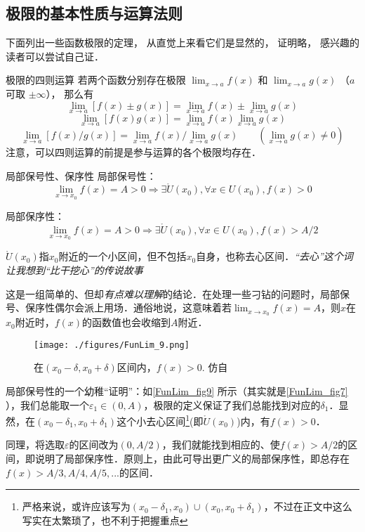\subsection{极限的基本性质与运算法则}
下面列出一些函数极限的定理， 从直觉上来看它们是显然的， 证明略， 感兴趣的读者可以尝试自己证．
\begin{theorem}{极限的四则运算}
若两个函数分别存在极限 $\lim_{x\to a} f(x)$ 和 $\lim_{x\to a} g(x)$ （$a$ 可取 $\pm \infty$）， 那么有
\begin{equation}
\lim_{x\to a} [f(x) \pm g(x)] = \lim_{x\to a}f(x) \pm  \lim_{x\to a} g(x)
\end{equation}
\begin{equation}
\lim_{x\to a} [f(x) g(x)] = \lim_{x\to a}f(x) \lim_{x\to a} g(x)
\end{equation}
\begin{equation}
\lim_{x\to a} [f(x)/g(x)] = \lim_{x\to a}f(x)/\lim_{x\to a} g(x) \qquad (\lim_{x\to a} g(x) \ne 0)
\end{equation}
注意，可以四则运算的前提是参与运算的各个极限均存在．
\end{theorem}

\begin{theorem}{局部保号性、保序性}
局部保号性：
\begin{equation}
\lim_{x\to x_0}f(x)=A>0\Rightarrow \exists \mathring{U} (x_0), \forall x \in U(x_0), f(x)>0
\end{equation}

局部保序性：
\begin{equation}
\lim_{x\to x_0}f(x)=A>0 \Rightarrow \exists \mathring{U} (x_0), \forall x \in U(x_0), f(x)>A/2
\end{equation}

$\mathring{U} (x_0)$指$x_0$附近的一个小区间，但不包括$x_0$自身，也称去心区间．\textsl{“去心”这个词让我想到“比干挖心”的传说故事}

这是一组简单的、但却\textsl{有点难以理解}的结论．在处理一些刁钻的问题时，局部保号、保序性偶尔会派上用场．通俗地说，这意味着若$\lim_{x\to x_0}f(x)=A$，则$x$在$x_0$附近时，$f(x)$的函数值也会收缩到$A$附近．

\begin{figure}[ht]
\centering
\texttt{[image: ./figures/FunLim\_9.png]}
\caption{在$(x_0-\delta, x_0+\delta)$区间内，$f(x)>0$. 仿自\cite{Thomas}} \label{FunLim_fig9}
\end{figure}
局部保号性的一个幼稚“证明”：如\autoref{FunLim_fig9} 所示（其实就是\autoref{FunLim_fig7} ），我们总能取一个$\varepsilon_1 \in (0,A)$，极限的定义保证了我们总能找到对应的$\delta_1$．显然，在$(x_0-\delta_1, x_0+\delta_1)$这个小去心区间\footnote{严格来说，或许应该写为$(x_0-\delta_1,x_0)\cup(x_0, x_0+\delta_1)$，不过在正文中这么写实在太繁琐了，也不利于把握重点}(即$\mathring{U} ({x_0})$)内，有$f(x)>0$．

同理，将选取$\varepsilon$的区间改为$(0,A/2)$，我们就能找到相应的、使$f(x)>A/2$的区间，即说明了局部保序性．原则上，由此可导出更广义的局部保序性，即总存在$f(x)>A/3,A/4,A/5,...$的区间．

\end{theorem}